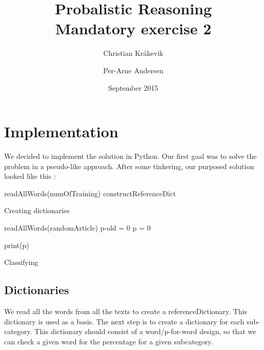 \documentclass{article}
\title{Probalistic Reasoning \\  \large Mandatory exercise 2}
\author{Christian Kråkevik \and Per-Arne Andersen}
\date{September 2015}
\begin{document}



\maketitle

\newpage

\section{Implementation}
We decided to implement the solution in Python. Our first goal was to solve the problem in a pseudo-like approach. After some tinkering, our purposed solution looked like this :
\\

\begin{algorithm}[H]
  readAllWords(numOfTraining)\;
  constructReferenceDict\;

 \caption{Creating dictionaries}
\end{algorithm}

\vspace*{8px}

\begin{algorithm}[H]


  readAllWords(randomArticle)\;
  p-old = 0\;
  p = 0\;

 print(p)
 \caption{Classifying}
\end{algorithm}

\vspace*{8px}
\newpage
\subsection {Dictionaries}
We read all the words from all the texts to create a referenceDictionary. This dictionary is used as a basis.
The next step is to create a dictionary for each sub-category. This dictionary should consist of a word/p-for-word
design, so that we can check a given word for the percentage for a given subcategory.
\end{document}
